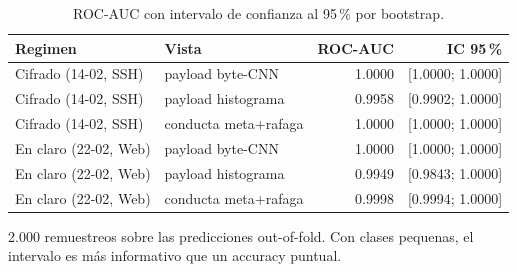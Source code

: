 \begin{table}[htbp]
  \centering
  \caption{ROC-AUC con intervalo de confianza al 95\,\% por bootstrap.}
  \label{tab:rigor}
  \begin{tabular}{llrr}
    \toprule
    \textbf{Regimen} & \textbf{Vista} & \textbf{ROC-AUC} & \textbf{IC 95\,\%} \\
    \midrule
    Cifrado (14-02, SSH) & payload byte-CNN & 1.0000 & [1.0000; 1.0000] \\
    Cifrado (14-02, SSH) & payload histograma & 0.9958 & [0.9902; 1.0000] \\
    Cifrado (14-02, SSH) & conducta meta+rafaga & 1.0000 & [1.0000; 1.0000] \\
    En claro (22-02, Web) & payload byte-CNN & 1.0000 & [1.0000; 1.0000] \\
    En claro (22-02, Web) & payload histograma & 0.9949 & [0.9843; 1.0000] \\
    En claro (22-02, Web) & conducta meta+rafaga & 0.9998 & [0.9994; 1.0000] \\
    \bottomrule
  \end{tabular}
  \par\smallskip\footnotesize{2.000 remuestreos sobre las predicciones out-of-fold. Con clases pequenas, el intervalo es más informativo que un accuracy puntual.}
\end{table}
